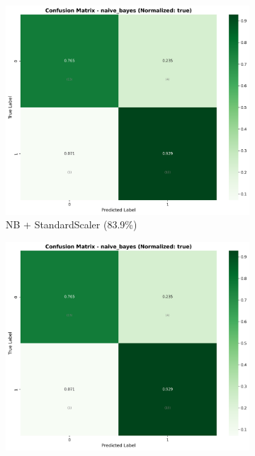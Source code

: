 \begin{figure}[H]
\centering
\begin{subfigure}[b]{0.315\textwidth}
\centering
\includegraphics[width=1\textwidth]{Result/cleveland_dataset/confusion_matrices/naive_bayes_numeric_dataset_StandardScaler.png}
\caption{NB + StandardScaler (83.9\%)}
\label{fig:nb_standardscaler_all}
\end{subfigure}
\hfill
\begin{subfigure}[b]{0.315\textwidth}
\centering
\includegraphics[width=1\textwidth]{Result/cleveland_dataset/confusion_matrices/naive_bayes_numeric_dataset_MinMaxScaler.png}

\end{subfigure}
\end{figure}
